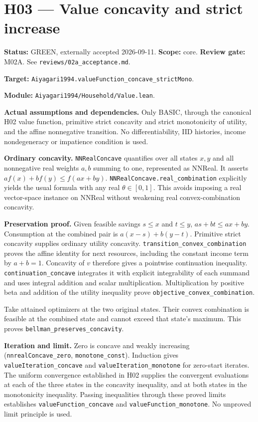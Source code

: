 \documentclass[
  11pt,
]{article}
\let\LedgerOriginalTexttt\texttt
\renewcommand{\texttt}[1]{{\small\LedgerOriginalTexttt{#1}}}
\begin{document}
\section{H03 --- Value concavity and strict
increase}\label{h03-value-concavity-and-strict-increase}

\textbf{Status:} GREEN, externally accepted 2026-09-11. \textbf{Scope:}
core. \textbf{Review gate:} M02A. See
\texttt{reviews/02a\_acceptance.md}.

\textbf{Target:}
\texttt{Aiyagari1994.valueFunction\_concave\_strictMono}.

\textbf{Module:} \texttt{Aiyagari1994/Household/Value.lean}.

\textbf{Actual assumptions and dependencies.} Only BASIC, through the
canonical H02 value function, primitive strict concavity and strict
monotonicity of utility, and the affine nonnegative transition. No
differentiability, IID histories, income nondegeneracy or impatience
condition is used.

\textbf{Ordinary concavity.} \texttt{NNRealConcave} quantifies over all
states \(x,y\) and all nonnegative real weights \(a,b\) summing to one,
represented as NNReal. It asserts \(a f(x)+b f(y)\leq f(ax+by)\).
\texttt{NNRealConcave.real\_combination} explicitly yields the usual
formula with any real \(\theta\in[0,1]\). This avoids imposing a real
vector-space instance on NNReal without weakening real
convex-combination concavity.

\textbf{Preservation proof.} Given feasible savings \(s\leq x\) and
\(t\leq y\), \(as+bt\leq ax+by\). Consumption at the combined pair is
\(a(x-s)+b(y-t)\). Primitive strict concavity supplies ordinary utility
concavity. \texttt{transition\_convex\_combination} proves the affine
identity for next resources, including the constant income term by
\(a+b=1\). Concavity of \(v\) therefore gives a pointwise continuation
inequality. \texttt{continuation\_concave} integrates it with explicit
integrability of each summand and uses integral addition and scalar
multiplication. Multiplication by positive beta and addition of the
utility inequality prove \texttt{objective\_convex\_combination}.

Take attained optimizers at the two original states. Their convex
combination is feasible at the combined state and cannot exceed that
state's maximum. This proves \texttt{bellman\_preserves\_concavity}.

\textbf{Iteration and limit.} Zero is concave and weakly increasing
(\texttt{nnrealConcave\_zero}, \texttt{monotone\_const}). Induction
gives \texttt{valueIteration\_concave} and
\texttt{valueIteration\_monotone} for zero-start iterates. The uniform
convergence established in H02 supplies the convergent evaluations at
each of the three states in the concavity inequality, and at both states
in the monotonicity inequality. Passing inequalities through these
proved limits establishes \texttt{valueFunction\_concave} and
\texttt{valueFunction\_monotone}. No unproved limit principle is used.
\end{document}
